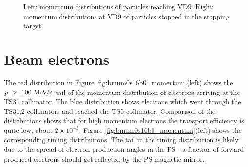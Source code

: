 \documentclass[12pt]{article}
\newcommand {\MeVc}       {\mbox{$\rm MeV\!/c$}}
\begin{document}
\begin{figure}[H]
  \hspace{-0.5in}
  \caption{
    \label{fig:03700_bmum0s37b0_vdet_xx09_mom}
    Left: momentum distributions of particles reaching VD9;
    Right: momentum distributions at VD9 of particles stopped in the stopping target
  }
\end{figure}


\section {Beam electrons}

The red distribution in Figure \ref{fig:bmum0s16b0_momentum}(left) shows the $p ~>~ 100~\MeVc$
tail of the momentum distribution of electrons arriving at the TS31 collimator.
The blue distribution shows electrons which went through the TS31,2 collimators
and reached the TS5 collimator. Comparison of the distributions shows that for high momentum electrons
the transport efficiency is quite low, about $2\times10^{-3}$.
Figure \ref{fig:bmum0s16b0_momentum}(left) shows the corresponding timing distributions.
The tail in the timing distribution is likely due to the spread of electron production angles
in the PS - a fraction of forward produced electrons should get reflected by the PS magnetic mirror.
\end{document}
